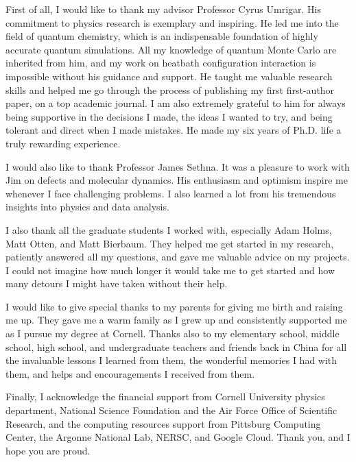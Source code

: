 \documentclass[phd,tocprelim]{cornell}
\begin{document}
\begin{acknowledgements}
First of all, I would like to thank my advisor Professor Cyrus Umrigar.
His commitment to physics research is exemplary and inspiring.
He led me into the field of quantum chemistry, which is an indispensable foundation of highly accurate quantum simulations.
All my knowledge of quantum Monte Carlo are inherited from him, and my work on heatbath configuration interaction is impossible without his guidance and support.
He taught me valuable research skills and helped me go through the process of publishing my first first-author paper, on a top academic journal.
I am also extremely grateful to him for always being supportive in the decisions I made, the ideas I wanted to try, and being tolerant and direct when I made mistakes.
He made my six years of Ph.D. life a truly rewarding experience.

I would also like to thank Professor James Sethna.
It was a pleasure to work with Jim on defects and molecular dynamics.
His enthusiasm and optimism inspire me whenever I face challenging problems.
I also learned a lot from his tremendous insights into physics and data analysis.

I also thank all the graduate students I worked with, especially Adam Holms, Matt Otten, and Matt Bierbaum.
They helped me get started in my research, patiently answered all my questions, and gave me valuable advice on my projects.
I could not imagine how much longer it would take me to get started and how many detours I might have taken without their help.

I would like to give special thanks to my parents for giving me birth and raising me up.
They gave me a warm family as I grew up and consistently supported me as I pursue my degree at Cornell.
Thanks also to my elementary school, middle school, high school, and undergraduate teachers and friends back in China for all the invaluable lessons I learned from them, the wonderful memories I had with them, and helps and encouragements I received from them.

Finally, I acknowledge the financial support from Cornell University physics department, National Science Foundation and the Air Force Office of Scientific Research, and the computing resources support from Pittsburg Computing Center, the Argonne National Lab, NERSC, and Google Cloud.
Thank you, and I hope you are proud.
\end{acknowledgements}

\contentspage
\tablelistpage
\figurelistpage
\end{document}

